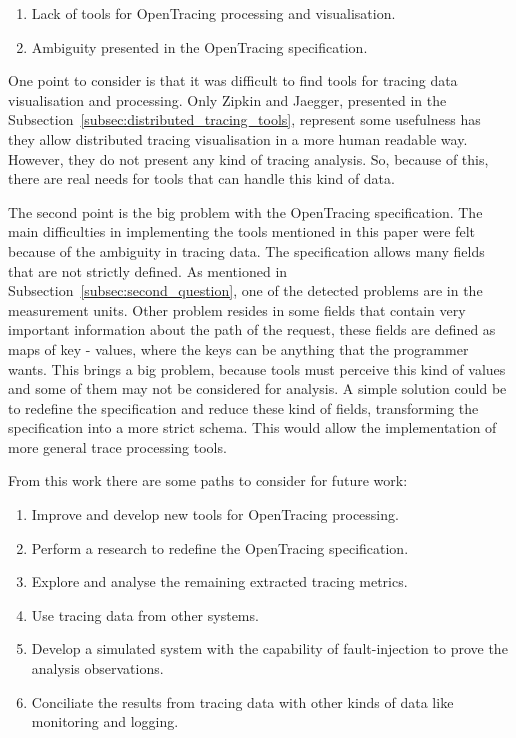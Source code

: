 \begin{enumerate}
    \item Lack of tools for OpenTracing processing and visualisation.
    \item Ambiguity presented in the OpenTracing specification.
\end{enumerate}

One point to consider is that it was difficult to find tools for tracing data visualisation and processing. Only Zipkin and Jaegger, presented in the Subsection~\ref{subsec:distributed_tracing_tools}, represent some usefulness has they allow distributed tracing visualisation in a more human readable way. However, they do not present any kind of tracing analysis. So, because of this, there are real needs for tools that can handle this kind of data.

The second point is the big problem with the OpenTracing specification. The main difficulties in implementing the tools mentioned in this paper were felt because of the ambiguity in tracing data. The specification allows many fields that are not strictly defined. As mentioned in Subsection~\ref{subsec:second_question}, one of the detected problems are in the measurement units. Other problem resides in some fields that contain very important information about the path of the request, these fields are defined as maps of key - values, where the keys can be anything that the programmer wants. This brings a big problem, because tools must perceive this kind of values and some of them may not be considered for analysis. A simple solution could be to redefine the specification and reduce these kind of fields, transforming the specification into a more strict schema. This would allow the implementation of more general trace processing tools.


From this work there are some paths to consider for future work:

\begin{enumerate}
    \item Improve and develop new tools for OpenTracing processing.
    \item Perform a research to redefine the OpenTracing specification. 
    \item Explore and analyse the remaining extracted tracing metrics.
    \item Use tracing data from other systems.
    \item Develop a simulated system with the capability of fault-injection to prove the analysis observations.
    \item Conciliate the results from tracing data with other kinds of data like monitoring and logging.
\end{enumerate}

